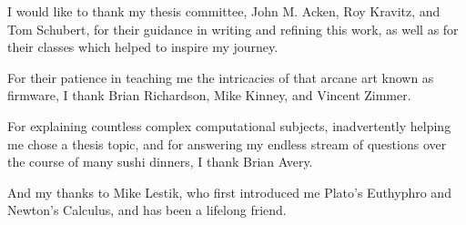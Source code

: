 \noindent I would like to thank my thesis committee, John M. Acken, Roy Kravitz, and Tom Schubert, for their guidance in writing and refining this work, as well as for their classes which helped to inspire my journey.

\vspace{1cm}

\noindent For their patience in teaching me the intricacies of that arcane art known as firmware, I thank Brian Richardson, Mike Kinney, and Vincent Zimmer.

\vspace{1cm}

\noindent For explaining countless complex computational subjects, inadvertently helping me chose a thesis topic, and for answering my endless stream of questions over the course of many sushi dinners, I thank Brian Avery.

\vspace{1cm}

\noindent And my thanks to Mike Lestik, who first introduced me Plato's Euthyphro and Newton's Calculus, and has been a lifelong friend.
